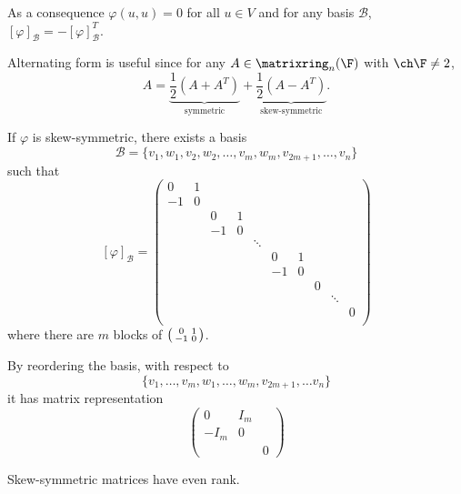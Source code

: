 \documentclass[a4paper]{article}
\newcommand*{\M}{\matrixring}
\newcommand*{\basis}{\mathcal}
\theoremstyle{definition}
\begin{document}
As a consequence \(\varphi(u, u) = 0\) for all \(u \in V\) and for any basis \(\basis B\), \([\varphi]_{\basis B} = - [\varphi]_{\basis B}^T\).

\begin{remark}
  Alternating form is useful since for any \(A \in \M_n(\F)\) with \(\ch \F \neq 2\),
  \[
    A = \underbrace{\frac{1}{2}(A + A^T)}_{\text{symmetric}} + \underbrace{\frac{1}{2}(A - A^T)}_{\text{skew-symmetric}}.
  \]
\end{remark}

\begin{theorem}
  If \(\varphi\) is skew-symmetric, there exists a basis
  \[
    \basis B = \{v_1, w_1, v_2, w_2, \dots, v_m, w_m, v_{2m + 1}, \dots, v_n\}
  \]
  such that
  \[
    [\varphi]_{\basis B} =
    \begin{pmatrix}
      0 & 1 & & & & & & & & \\
      -1 & 0 & & & & & & & & \\
      & & 0 & 1 & & & & & & \\
      & & -1 & 0 & & & & & & \\
      & & & & \ddots & & & & & \\
      & & & & & 0 & 1 & & & \\
      & & & & & -1 & 0 & & & \\
      & & & & & & & 0 & &\\
      & & & & & & & & \ddots & \\
      & & & & & & & & & 0 \\
    \end{pmatrix}
  \]
  where there are \(m\) blocks of \(\begin{psmallmatrix} 0 & 1 \\ -1 & 0 \end{psmallmatrix}\).
\end{theorem}

\begin{remark}
  By reordering the basis, with respect to
  \[
    \{v_1, \dots, v_m, w_1, \dots, w_m, v_{2m + 1}, \dots v_n\}
  \]
  it has matrix representation
  \[
    \begin{pmatrix}
      0 & I_m & \\
      -I_m & 0 & \\
      & & 0
    \end{pmatrix}
  \]
\end{remark}

\begin{remark}
  Skew-symmetric matrices have even rank.
\end{remark}
\end{document}
